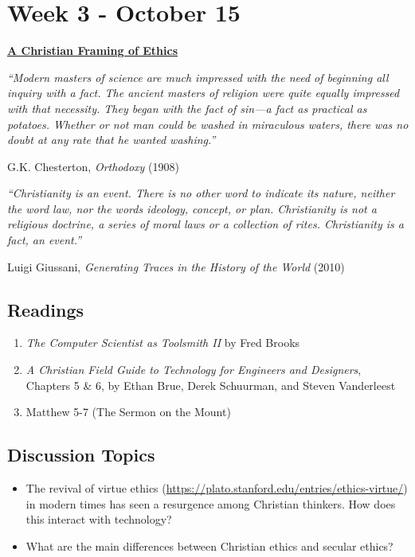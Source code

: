 \documentclass[12pt]{article}
\let\oldsection\section
\renewcommand\section{\clearpage\oldsection}
\begin{document}
\section*{Week 3 - October 15}
\label{sec:org10b7842}
\begin{center}
\large \textbf{\uline{A Christian Framing of Ethics}}
\end{center}
\begin{mdframed}
\emph{``Modern masters of science are much impressed with the need of beginning all
inquiry with a fact. The ancient masters of religion were quite equally
impressed with that necessity. They began with the fact of sin—a fact as
practical as potatoes. Whether or not man could be washed in miraculous waters,
there was no doubt at any rate that he wanted washing.''}

\hfill G.K. Chesterton, \emph{Orthodoxy} (1908) \newline

\noindent \emph{``Christianity is an event. There is no other word to indicate its nature, neither the word
law, nor the words ideology, concept, or plan. Christianity is not a religious doctrine, a
series of moral laws or a collection of rites. Christianity is a fact, an event.''}

\hfill Luigi Giussani, \emph{Generating Traces in the History of the World} (2010)
\end{mdframed}
\subsection*{Readings}
\label{sec:org341b038}
\begin{enumerate}
\item \emph{The Computer Scientist as Toolsmith II} by Fred Brooks
\item \emph{A Christian Field Guide to Technology for Engineers and Designers}, Chapters
5 \& 6, by Ethan Brue, Derek Schuurman, and Steven Vanderleest
\item Matthew 5-7 (The Sermon on the Mount)
\end{enumerate}
\subsection*{Discussion Topics}
\label{sec:orgd328e87}
\begin{itemize}
\item The revival of virtue ethics
(\url{https://plato.stanford.edu/entries/ethics-virtue/}) in modern times has seen a
resurgence among Christian thinkers. How does this interact with technology?
\item What are the main differences between Christian ethics and secular ethics?
\end{itemize}
\end{document}
